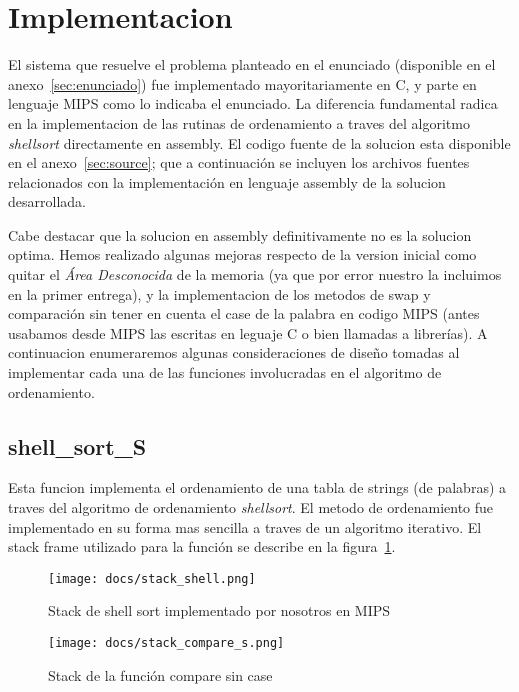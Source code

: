 \documentclass[a4paper,11pt]{article}
\begin{document}
\section{Implementacion}

  El sistema que resuelve el problema planteado en el enunciado (disponible en el
  anexo~\ref{sec:enunciado}) fue implementado mayoritariamente en C, y parte en
  lenguaje MIPS como lo indicaba el enunciado. La diferencia fundamental radica 
  en la implementacion de las rutinas de ordenamiento a traves del algoritmo
  \textit{shellsort} directamente en assembly. El codigo fuente de
  la solucion esta disponible en el anexo~\ref{sec:source}; que a continuación
  se incluyen los archivos fuentes relacionados con la implementación en
  lenguaje assembly de la solucion desarrollada.

  Cabe destacar que la solucion en assembly definitivamente no es la solucion
  optima. Hemos realizado algunas mejoras respecto de la version inicial como
  quitar el \textit{Área Desconocida} de la memoria (ya que por error nuestro la 
  incluimos en la primer entrega), y la implementacion de los metodos de swap 
  y comparación sin tener en cuenta el case de la palabra en codigo MIPS 
  (antes usabamos desde MIPS las escritas en leguaje C o bien llamadas a librerías).
  A continuacion enumeraremos algunas consideraciones de diseño tomadas al
  implementar cada una de las funciones involucradas en el algoritmo de
  ordenamiento.

\subsection{shell\_sort\_S}

  Esta funcion implementa el ordenamiento de una tabla de strings (de palabras)
  a traves del algoritmo de ordenamiento \textit{shellsort}. El metodo de 
  ordenamiento fue implementado en su forma mas sencilla a traves de un 
  algoritmo iterativo. El stack frame utilizado para la función se describe 
  en la figura~\ref{fig:stack_shell_sort}.

\begin{figure}[h!]
  \centering
  \texttt{[image: docs/stack\_shell.png]}
  \caption{Stack de shell sort implementado por nosotros en MIPS}
  \label{fig:stack_shell_sort}
\end{figure}

\begin{figure}[h!]
  \centering
  \texttt{[image: docs/stack\_compare\_s.png]}
  \caption{Stack de la función compare sin case}
\end{figure}
\end{document}

